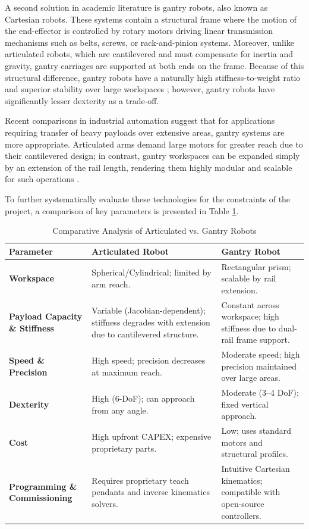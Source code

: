 A second solution in academic literature is gantry robots, also known as Cartesian robots. These systems contain a structural frame where the motion of the end-effector is controlled by rotary motors driving linear transmission mechanisms such as belts, screws, or rack-and-pinion systems. Moreover, unlike articulated robots, which are cantilevered and must compensate for inertia and gravity, gantry carriages are supported at both ends on the frame. Because of this structural difference, gantry robots have a naturally high stiffness-to-weight ratio and superior stability over large workspaces \cite{groover2016automation}; however, gantry robots have significantly lesser dexterity as a trade-off.

Recent comparisons in industrial automation suggest that for applications requiring transfer of heavy payloads over extensive areas, gantry systems are more appropriate. Articulated arms demand large motors for greater reach due to their cantilevered design; in contrast, gantry workspaces can be expanded simply by an extension of the rail length, rendering them highly modular and scalable for such operations \cite{bostelman2016survey}.

To further systematically evaluate these technologies for the constraints of the project, a comparison of key parameters is presented in Table \ref{tab:robot_comparison}.

\begin{table}[H]
    \centering
    \caption{Comparative Analysis of Articulated vs. Gantry Robots \cite{siciliano2016robotics, groover2016automation}}
    \label{tab:robot_comparison}
    \renewcommand{\arraystretch}{1.3}
    \begin{tabular}{@{}p{2.4cm} p{5.4cm} p{5.4cm}@{}}
        \toprule
        \textbf{Parameter} & \textbf{Articulated Robot} & \textbf{Gantry Robot} \\
        \midrule
        \textbf{Workspace} & Spherical/Cylindrical; limited by arm reach. & Rectangular prism; scalable by rail extension. \\
        \hline
        \textbf{Payload Capacity \& Stiffness} & Variable (Jacobian-dependent); stiffness degrades with extension due to cantilevered structure. & Constant across workspace; high stiffness due to dual-rail frame support. \\
        \hline
        \textbf{Speed \& Precision} & High speed; precision decreases at maximum reach. & Moderate speed; high precision maintained over large areas. \\
        \hline
        \textbf{Dexterity} & High (6-DoF); can approach from any angle. & Moderate (3--4 DoF); fixed vertical approach. \\
        \hline
        \textbf{Cost} & High upfront CAPEX; expensive proprietary parts. & Low; uses standard motors and structural profiles. \\
        \hline
        \textbf{Programming \& Commissioning} & Requires proprietary teach pendants and inverse kinematics solvers. & Intuitive Cartesian kinematics; compatible with open-source controllers. \\
        \bottomrule
    \end{tabular}
\end{table}

